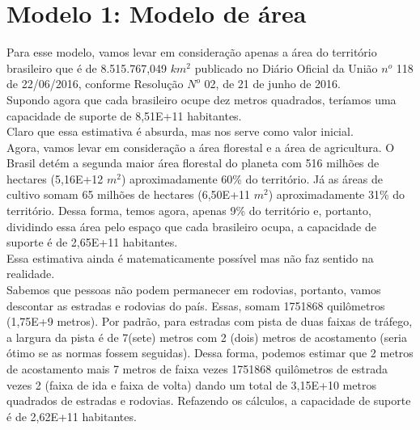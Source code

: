 \documentclass[a4paper]{article}
\begin{document}
\section{Modelo 1: Modelo de \'{a}rea}
Para esse modelo, vamos levar em considera\c{c}\~{a}o apenas a \'{a}rea do territ\'{o}rio brasileiro que \'{e} de  8.515.767,049 $km^2$ publicado no Di\'{a}rio Oficial da Uni\~{a}o $n^o$ 118 de 22/06/2016, conforme Resolu\c{c}\~{a}o $N^o$ 02, de 21 de junho de 2016.
\\
Supondo agora que cada brasileiro ocupe dez metros quadrados, ter\'{i}amos uma capacidade de suporte de 8,51E+11 habitantes.
\\
Claro que essa estimativa \'{e} absurda, mas nos serve como valor inicial.
\\
Agora, vamos levar em considera\c{c}\~{a}o a \'area florestal e a \'{a}rea de agricultura. O Brasil det\'{e}m a segunda maior \'{a}rea florestal do planeta com 516 milh\~{o}es de hectares (5,16E+12 $m^2$) aproximadamente 60\% do territ\'{o}rio. J\'{a} as \'{a}reas de cultivo somam 65 milh\~{o}es de hectares (6,50E+11 $m^2$) aproximadamente 31\% do territ\'{o}rio. Dessa forma, temos agora, apenas 9\% do territ\'{o}rio e, portanto, dividindo essa \'{a}rea pelo espa\c{c}o que cada brasileiro ocupa, a capacidade de suporte \'{e} de 2,65E+11 habitantes.
\\
Essa estimativa ainda \'{e} matematicamente poss\'{i}vel mas n\~{a}o faz sentido na realidade.
\\
Sabemos que pessoas n\~{a}o podem permanecer em rodovias, portanto, vamos descontar as estradas e rodovias do pa\'{i}s. Essas, somam 1751868 quil\^{o}metros (1,75E+9 metros). Por padr\~{a}o, para estradas com pista de duas faixas de tr\'{a}fego, a largura da pista \'{e} de 7(sete) metros com 2 (dois) metros de acostamento (seria \'{o}timo se as normas fossem seguidas). Dessa forma, podemos estimar que 2 metros de acostamento mais 7 metros de faixa vezes 1751868 quil\^{o}metros de estrada vezes 2 (faixa de ida e faixa de volta) dando um total de 3,15E+10 metros quadrados de estradas e rodovias. Refazendo os c\'{a}lculos, a capacidade de suporte \'{e} de 2,62E+11 habitantes. 
\\
\end{document}
